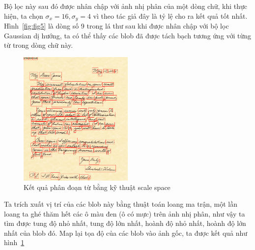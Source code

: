 \documentclass[a4paper]{article}
\begin{document}
Bộ lọc này sau đó được nhân chập với ảnh nhị phân của một dòng chữ, khi thực hiện, ta chọn $\sigma_x = 16, \sigma_y = 4$ vì theo tác giả đây là tỷ lệ cho ra kết quả tốt nhất. Hình~\ref{fig:fig5} là dòng số 9 trong lá thư sau khi được nhân chập với bộ lọc Gaussian dị hướng, ta có thể thấy các blob đã được tách bạch tương ứng với từng từ trong dòng chữ này.\par

\begin{figure}
    \centering
    \includegraphics[width=0.5\textwidth]{boxes.png}
    \caption{Kết quả phân đoạn từ bằng kỹ thuật scale space}
    \label{fig:fig6}
\end{figure}


Ta trích xuất vị trí của các blob này bằng thuật toán loang ma trận, một lần loang ta ghé thăm hết các ô màu đen (ô có mực) trên ảnh nhị phân, như vậy ta tìm được tung độ nhỏ nhất, tung độ lớn nhất, hoành độ nhỏ nhất, hoành độ lớn nhất của blob đó. Map lại tọa độ của các blob vào ảnh gốc, ta được kết quả như hình~\ref{fig:fig6}

\pagebreak
\end{document}
